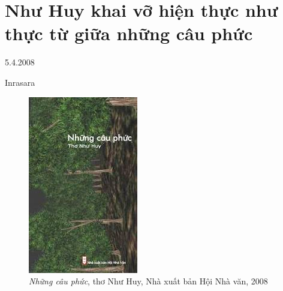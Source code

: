 \documentclass[../main.tex]{subfiles}
\begin{document}
\chapter{Như Huy khai vỡ hiện thực như thực từ giữa những câu phức}

\begin{metadata}

\begin{flushright}5.4.2008\end{flushright}

Inrasara 



\end{metadata}

\begin{multicols}{2}

\begin{figure}
	\centering
	\includegraphics[width=\textwidth]{../img/tho050408.jpg}
	\caption{
\textit{Những câu phức}, thơ Như Huy, Nhà xuất bản Hội Nhà văn, 2008}
\end{figure}
     \begin{blockquote}
 

\end{blockquote}
\end{multicols}
\end{document}
